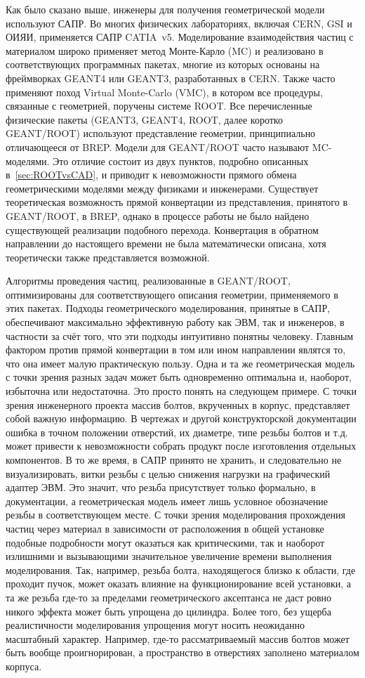Как было сказано выше, инженеры для получения геометрической модели используют САПР. Во многих физических лабораториях, включая CERN, GSI и ОИЯИ, применяется САПР CATIA~v5. Моделирование взаимодействия частиц с материалом широко применяет метод Монте-Карло (MC) и реализовано в соответствующих программных пакетах, многие из которых основаны на фреймворках GEANT4 или GEANT3, разработанных в CERN. Также часто применяют поход Virtual Monte-Carlo (VMC), в котором все процедуры, связанные с геометрией, поручены системе ROOT. Все перечисленные физические пакеты (GEANT3, GEANT4, ROOT, далее коротко GEANT/ROOT) используют представление геометрии, принципиально отличающееся от BREP. Модели для GEANT/ROOT часто называют MC-моделями. Это отличие состоит из двух пунктов, подробно описанных в~\ref{sec:ROOTvsCAD}, и приводит к невозможности прямого обмена геометрическими моделями между физиками и инженерами. Существует теоретическая возможность прямой конвертации из представления, принятого в GEANT/ROOT, в BREP, однако в процессе работы не было найдено существующей реализации подобного перехода. Конвертация в обратном направлении до настоящего времени не была математически описана, хотя теоретически также представляется возможной.

Алгоритмы проведения частиц, реализованные в GEANT/ROOT, оптимизированы для соответствующего описания геометрии, применяемого в этих пакетах. Подходы геометрического моделирования, принятые в САПР, обеспечивают максимально эффективную работу как ЭВМ, так и инженеров, в частности за счёт того, что эти подходы интуитивно понятны человеку. Главным фактором против прямой конвертации в том или ином направлении являтся то, что она имеет малую практическую пользу. Одна и та же геометрическая модель с точки зрения разных задач может быть одновременно оптимальна и, наоборот, избыточна или недостаточна. Это просто понять на следующем примере. С точки зрения инженерного проекта массив болтов, вкрученных в корпус, представляет собой важную информацию. В чертежах и другой конструкторской документации ошибка в точном положении отверстий, их диаметре, типе резьбы болтов и т.д. может привести к невозможности собрать продукт после изготовления отдельных компонентов. В то же время, в САПР принято не хранить, и следовательно не визуализировать, витки резьбы с целью снижения нагрузки на графический адаптер ЭВМ. Это значит, что резьба присутствует только формально, в документации, а геометрическая модель имеет лишь условное обозначение резьбы в соответствующем месте. С точки зрения моделирования прохождения частиц через материал в зависимости от расположения в общей установке подобные подробности могут оказаться как критическими, так и наоборот излишними и вызывающими значительное увеличение времени выполнения моделирования. Так, например, резьба болта, находящегося близко к области, где проходит пучок, может оказать влияние на функционирование всей установки, а та же резьба где-то за пределами геометрического аксептанса не даст ровно никого эффекта может быть упрощена до цилиндра. Более того, без ущерба реалистичности моделирования упрощения могут носить неожиданно масштабный характер. Например, где-то рассматриваемый массив болтов может быть вообще проигнорирован, а пространство в отверстиях заполнено материалом корпуса.


